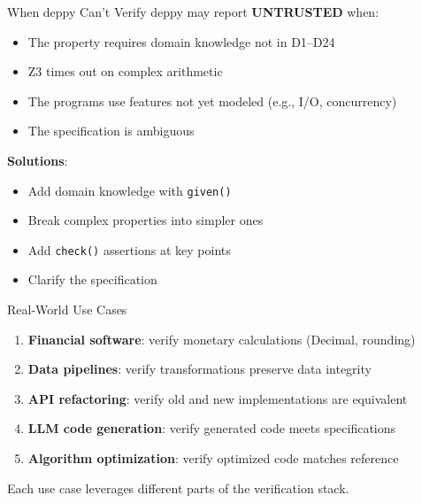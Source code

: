 \documentclass[aspectratio=169,11pt]{beamer}
\begin{document}
\begin{frame}{When deppy Can't Verify}
deppy may report \textbf{UNTRUSTED} when:
\begin{itemize}
\item The property requires domain knowledge not in D1--D24
\item Z3 times out on complex arithmetic
\item The programs use features not yet modeled (e.g., I/O, concurrency)
\item The specification is ambiguous
\end{itemize}

\vspace{0.5em}
\textbf{Solutions}:
\begin{itemize}
\item Add domain knowledge with \texttt{given()}
\item Break complex properties into simpler ones
\item Add \texttt{check()} assertions at key points
\item Clarify the specification
\end{itemize}
\end{frame}

\begin{frame}{Real-World Use Cases}
\begin{enumerate}
\item \textbf{Financial software}: verify monetary calculations (Decimal, rounding)
\item \textbf{Data pipelines}: verify transformations preserve data integrity
\item \textbf{API refactoring}: verify old and new implementations are equivalent
\item \textbf{LLM code generation}: verify generated code meets specifications
\item \textbf{Algorithm optimization}: verify optimized code matches reference
\end{enumerate}

\vspace{0.5em}
Each use case leverages different parts of the verification stack.
\end{frame}
\end{document}
